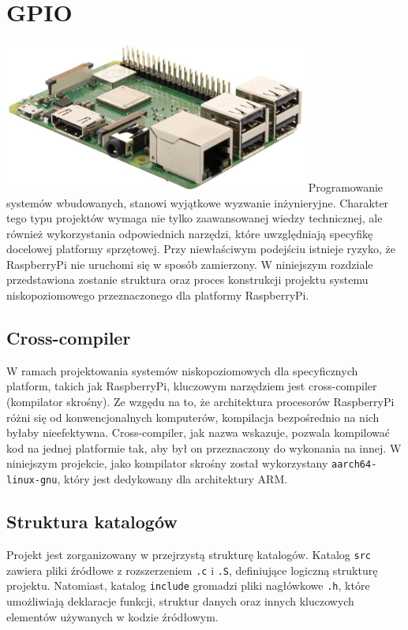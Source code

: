 \documentclass[shortabstract]{iithesis}
\begin{document}
\section{GPIO}
\begingroup
\centering
\includegraphics[width=0.75\textwidth]{rpi3b.jpg}
\endgroup
Programowanie systemów wbudowanych, stanowi wyjątkowe wyzwanie inżynieryjne. Charakter tego typu projektów wymaga nie tylko zaawansowanej wiedzy technicznej, ale również wykorzystania odpowiednich narzędzi, które uwzględniają specyfikę docelowej platformy sprzętowej. Przy niewłaściwym podejściu istnieje ryzyko, że RaspberryPi nie uruchomi się w sposób zamierzony. W niniejszym rozdziale przedstawiona zostanie struktura oraz proces konstrukcji projektu systemu niskopoziomowego przeznaczonego dla platformy RaspberryPi.
\subsection{Cross-compiler}
W ramach projektowania systemów niskopoziomowych dla specyficznych platform, takich jak RaspberryPi, kluczowym narzędziem jest cross-compiler (kompilator skrośny). Ze wzgędu na to, że architektura procesorów RaspberryPi różni się od konwencjonalnych komputerów, kompilacja bezpośrednio na nich byłaby nieefektywna. Cross-compiler, jak nazwa wskazuje, pozwala kompilować kod na jednej platformie tak, aby był on przeznaczony do wykonania na innej. W niniejszym projekcie, jako kompilator skrośny został wykorzystany \texttt{aarch64-linux-gnu}, który jest dedykowany dla architektury ARM.
\subsection{Struktura katalogów}
Projekt jest zorganizowany w przejrzystą strukturę katalogów. Katalog \texttt{src} zawiera pliki źródłowe z rozszerzeniem \texttt{.c} i \texttt{.S}, definiujące logiczną strukturę projektu. Natomiast, katalog \texttt{include} gromadzi pliki nagłówkowe \texttt{.h}, które umożliwiają deklaracje funkcji, struktur danych oraz innych kluczowych elementów używanych w kodzie źródłowym.
\end{document}
